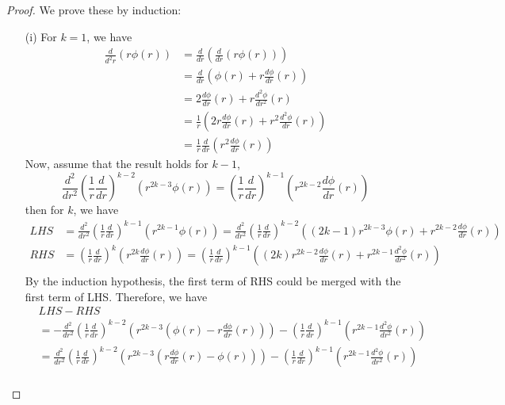 \documentclass[10pt]{article}
\begin{document}
\begin{proof}
    We prove these by induction: 
    \begin{itemize}
        \item [(i)] For $k=1$, we have
        \begin{align*}
            \frac{d}{d^2r}(r\phi(r)) &= \frac{d}{dr}\left(\frac{d}{dr}(r\phi(r))\right)\\
            &= \frac{d}{dr}\left(\phi(r)+r\frac{d\phi}{dr}(r)\right)\\
            &= 2\frac{d\phi}{dr}(r)+r\frac{d^2\phi}{dr^2}(r)\\
            &= \frac{1}{r}\left(2r\frac{d\phi}{dr}(r)+r^2\frac{d^2 \phi}{dr}(r)\right)\\
            &= \frac{1}{r}\frac{d}{dr}\left(r^2\frac{d\phi}{dr}(r)\right)
        \end{align*}
        Now, assume that the result holds for $k-1$, 
        \begin{equation*}
            \frac{d^2}{dr^2}\left(\frac{1}{r}\frac{d}{dr}\right)^{k-2}(r^{2k-3}\phi(r)) = \left(\frac{1}{r}\frac{d}{dr}\right)^{k-1}\left(r^{2k-2}\frac{d\phi}{dr}(r)\right)
        \end{equation*}
        then for $k$, we have
        \begin{align*}
            LHS &= \frac{d^2}{dr^2}\left(\frac{1}{r}\frac{d}{dr}\right)^{k-1}(r^{2k-1}\phi(r)) = \frac{d^2}{dr^2}\left(\frac{1}{r}\frac{d}{dr}\right)^{k-2}\left((2k-1)r^{2k-3}\phi(r)+r^{2k-2}\frac{d\phi}{dr}(r)\right)\\
            RHS &= \left(\frac{1}{r}\frac{d}{dr}\right)^k\left(r^{2k}\frac{d\phi}{dr}(r)\right) = \left(\frac{1}{r}\frac{d}{dr}\right)^{k-1}\left((2k)r^{2k-2}\frac{d\phi}{dr}(r)+r^{2k-1}\frac{d^2\phi}{dr^2}(r)\right)\\ 
        \end{align*}
        By the induction hypothesis, the first term of RHS could be merged with the first term of LHS. Therefore, we have
        \begin{align*}
            &LHS-RHS \\
            &= -\frac{d^2}{dr^2}\left(\frac{1}{r}\frac{d}{dr}\right)^{k-2}\left(r^{2k-3}\left(\phi(r)-r\frac{d\phi}{dr}(r)\right)\right)-\left(\frac{1}{r}\frac{d}{dr}\right)^{k-1}\left(r^{2k-1}\frac{d^2\phi}{dr^2}(r)\right)\\
            &= \frac{d^2}{dr^2}\left(\frac{1}{r}\frac{d}{dr}\right)^{k-2}\left(r^{2k-3}\left(r\frac{d\phi}{dr}(r)-\phi(r)\right)\right)-\left(\frac{1}{r}\frac{d}{dr}\right)^{k-1}\left(r^{2k-1}\frac{d^2\phi}{dr^2}(r)\right)\\

\end{align*}
\end{itemize}
\end{proof}
\end{document}

